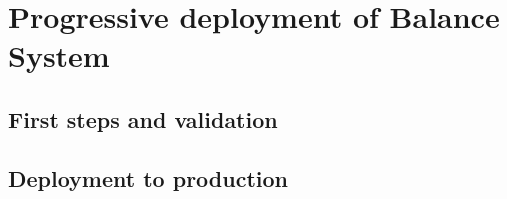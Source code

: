\chapter{Progressive deployment of Balance System}

\section{First steps and validation}

\section{Deployment to production}
